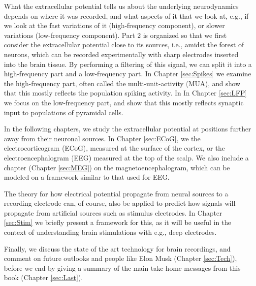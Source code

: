 What the extracellular potential tells us about the underlying neurodynamics depends on where it was recorded, and what aspects of it that we look at, e.g., if we look at the fast variations of it (high-frequency component), or slower variations (low-frequency component). Part 2 is organized so that we first consider the extracellular potential close to its sources, i.e., amidst the forest of neurons, which can be recorded experimentally with sharp electrodes inserted into the brain tissue. By performing a filtering of this signal, we can split it into a high-frequency part and a low-frequency part. In Chapter \ref{sec:Spikes} we examine the high-frequency part, often called the multi-unit-activity (MUA), and show that this mostly reflects the population spiking activity. In In Chapter \ref{sec:LFP} we focus on the low-frequency part, and show that this mostly reflects synaptic input to populations of pyramidal cells.

In the following chapters, we study the extracellular potential at positions further away from their neuronal sources. In Chapter \ref{sec:ECoG}, we the electrocorticogram (ECoG), measured at the surface of the cortex, or the electroencephalogram (EEG) measured at the top of the scalp. We also include a chapter (Chapter \ref{sec:MEG}) on the magnetoencephalogram, which can be modeled on a framework similar to that used for EEG. 

The theory for how electrical potential propagate from neural sources to a recording electrode can, of course, also be applied to predict how signals will propagate from artificial sources such as stimulus electrodes. In Chapter \ref{sec:Stim} we briefly present a framework for this, as it will be useful in the context of understanding brain stimulations with e.g., deep electrodes. 

Finally, we discuss the state of the art technology for brain recordings, and comment on future outlooks and people like Elon Musk (Chapter \ref{sec:Tech}), before we end  by giving a summary of the main take-home messages from this book (Chapter \ref{sec:Last}).
